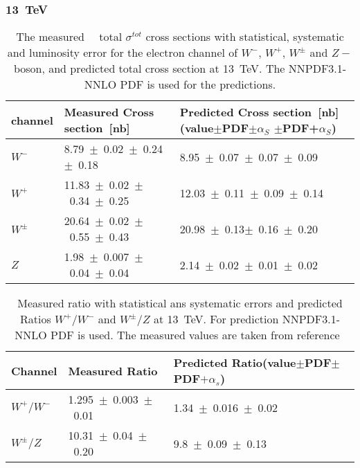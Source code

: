 \documentclass[a4paper,12pt]{report}
\numberwithin{equation}{section}
\begin{document}
\subsubsection{13~TeV}

\begin{table}[H]
\caption{The measured~\cite{Aad_2016}~\cite{CMS:2015ois} total $\sigma^{tot}$ cross sections with statistical, systematic and luminosity error for the electron channel of $W^{-}$, $W^{+}$, $W^{\pm}$ and $Z-$boson, and predicted total cross section at 13~TeV. The NNPDF3.1-NNLO PDF is used for the predictions.}
\centering
\begin{tabular}{|l|p{6cm}|p{6cm}| }
\hline
channel&\bf Measured Cross section~[nb] &\bf Predicted Cross section~[nb]\newline (value$\pm$PDF$\pm\alpha_{S}$ $\pm$PDF+$\alpha_{S}$)\\
\hline
\hline
$W^{-}$&8.79~$\pm$~0.02~$\pm$~0.24~$\pm$~0.18&8.95~$\pm$~0.07~$\pm$~0.07~$\pm$~0.09\\
$W^{+}$&11.83~$\pm$~0.02~$\pm$~0.34~$\pm$~0.25&12.03~$\pm$~0.11~$\pm$~0.09~$\pm$~0.14\\
$W^{\pm}$&20.64~$\pm$~0.02~$\pm$~0.55~$\pm$~0.43&20.98~$\pm$~0.13$\pm$~0.16~$\pm$~0.20\\
\hline
\hline
$Z$&1.98~$\pm$~0.007~$\pm$~0.04~$\pm$~0.04&2.14~$\pm$~0.02~$\pm$~0.01~$\pm$~0.02\\
\hline
\end{tabular}
\end{table}
 
\begin{table}[H]
\centering
\caption{Measured ratio with statistical ans systematic errors and predicted Ratios $W^{+}/W^{-}$ and $W^{\pm}/Z$ at 13~TeV. For prediction NNPDF3.1-NNLO PDF is used. The measured values are taken from reference~\cite{Aad_2016}}
\begin{tabular}{|l|p{6cm}|p{6cm}|}
\hline
Channel&\bf Measured Ratio&\bf Predicted Ratio\newline(value$\pm$PDF$\pm$PDF$+\alpha_{s}$)\\
\hline
\hline
$W^{+}/W^{-}$&1.295~$\pm$~0.003~$\pm$~0.01&1.34~$\pm$~0.016~$\pm$~0.02\\
$W^{\pm}/Z$&10.31~$\pm$~0.04~$\pm$~0.20&9.8~$\pm$~0.09~$\pm$~0.13\\
\hline
\end{tabular}
\end{table}
\end{document}
